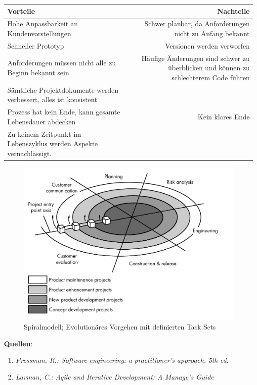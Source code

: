 \documentclass{scrartcl}
\begin{document}
\begin{center}
   \begin{tabular}{VN}
      \toprule
      \textbf{Vorteile} & \textbf{Nachteile} \\ 
      \midrule
      Hohe Anpassbarkeit an Kundenvorstellungen & Schwer planbar, da Anforderungen nicht zu Anfang bekannt\\
      Schneller Prototyp & Versionen werden verworfen \\
      Anforderungen müssen nicht alle zu Beginn bekannt sein & Häufige
      Änderungen sind schwer zu überblicken und können zu schlechterem Code
      führen \\
      Sämtliche Projektdokumente werden verbessert, alles ist konsistent & \\
      Prozess hat kein Ende, kann gesamte Lebensdauer abdecken & Kein klares
      Ende \\
      Zu keinem Zeitpunkt im Lebenszyklus werden Aspekte vernachlässigt. & \\
   \end{tabular}
\end{center}

\begin{figure}
   {\centering      
      \includegraphics[width=\textwidth]{evol_pressman.pdf}
   \caption{Spiralmodell; Evolutionäres Vorgehen mit definierten Task Sets}
   \label{evo}}
\end{figure}

\vspace{\baselineskip}
\noindent\textbf{Quellen}:
\begin{enumerate}
   \item \emph{Pressman, R.: Software engineering: a practitioner’s approach, 5th ed.}
   \item \emph{Larman, C.: Agile and Iterative Development: A Manage's Guide}
\end{enumerate}
\end{document}
